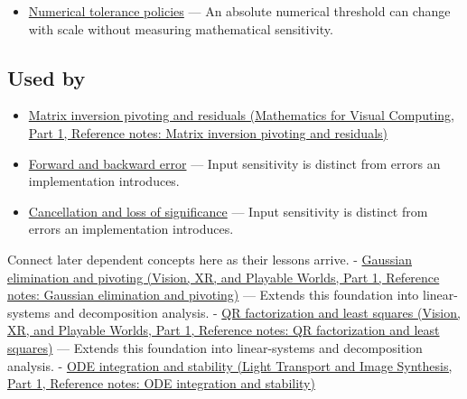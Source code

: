 \hypertarget{appendix-8f6a01f284a7-prerequisites}{}

\begin{itemize}
\tightlist
\item
  \hyperref[appendix-0ec599f8ba27]{Numerical tolerance policies} --- An absolute numerical threshold can change with scale without measuring mathematical sensitivity.
\end{itemize}

\subsection{Used by}\label{appendix-8f6a01f284a7-used-by}

\hypertarget{appendix-8f6a01f284a7-used-by}{}

\begin{itemize}
\item
  \href{../02-Mathematics-for-Visual-Computing-P01/main.pdf\#appendix-48d2e66378ab}{Matrix inversion pivoting and residuals (Mathematics for Visual Computing, Part 1, Reference notes: Matrix inversion pivoting and residuals)}
\item
  \hyperref[appendix-a7fbaf6d1b1c]{Forward and backward error} --- Input sensitivity is distinct from errors an implementation introduces.
\item
  \hyperref[appendix-a2773a6a2f9d]{Cancellation and loss of significance} --- Input sensitivity is distinct from errors an implementation introduces.
\end{itemize}

Connect later dependent concepts here as their lessons arrive. - \href{../07-Vision-XR-and-Playable-Worlds-P01/main.pdf\#appendix-f6e77f4a200f}{Gaussian elimination and pivoting (Vision, XR, and Playable Worlds, Part 1, Reference notes: Gaussian elimination and pivoting)} --- Extends this foundation into linear-systems and decomposition analysis. - \href{../07-Vision-XR-and-Playable-Worlds-P01/main.pdf\#appendix-c3421e6b4f2c}{QR factorization and least squares (Vision, XR, and Playable Worlds, Part 1, Reference notes: QR factorization and least squares)} --- Extends this foundation into linear-systems and decomposition analysis. - \href{../04-Light-Transport-and-Image-Synthesis-P01/main.pdf\#appendix-18eacf61a04b}{ODE integration and stability (Light Transport and Image Synthesis, Part 1, Reference notes: ODE integration and stability)}

